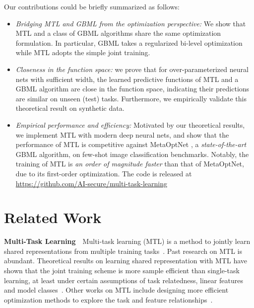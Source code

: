 \documentclass{article}
\begin{document}
Our contributions could be briefly summarized as follows:

\begin{itemize}[leftmargin=*,align=left,noitemsep,nolistsep]
    \item \emph{Bridging MTL and GBML from the optimization perspective:} We show that MTL and a class of GBML algorithms share the same {optimization formulation}. In particular, GBML takes a {regularized bi-level optimization} while MTL adopts the simple {joint training}.
    \item \emph{Closeness in the function space:} 
    we prove that for over-parameterized neural nets with sufficient width, the learned predictive functions of MTL and a GBML algorithm are close in the function space, indicating their predictions are similar on unseen (test) tasks. Furthermore, we empirically validate this theoretical result on synthetic data.
    \item \emph{Empirical performance and efficiency:} Motivated by our theoretical results, we implement MTL with modern deep neural nets, and show that the performance of MTL is competitive against MetaOptNet \cite{metaOptNet}, a \textit{state-of-the-art} GBML algorithm, on few-shot image classification benchmarks. Notably, the training of MTL is \textit{an order of magnitude faster} than that of MetaOptNet, due to its first-order optimization. The code is released at \url{https://github.com/AI-secure/multi-task-learning}
\end{itemize}

\section{Related Work}\label{sec:related-works}
\textbf{Multi-Task Learning}~~Multi-task learning (MTL) is a method to jointly learn shared representations from multiple training tasks~\cite{caruana1997multitask}. Past research on MTL is abundant. Theoretical results on learning shared representation with MTL have shown that the joint training scheme is more sample efficient than single-task learning, at least under certain assumptions of task relatedness, linear features and model classes~\cite{maurer2016benefit,tripuraneni2020theory}. Other works on MTL include designing more efficient optimization methods to explore the task and feature relationships~\citep{evgeniou2007multi,argyriou2008convex,zhang2010convex,zhao2020efficient}. 
\end{document}
